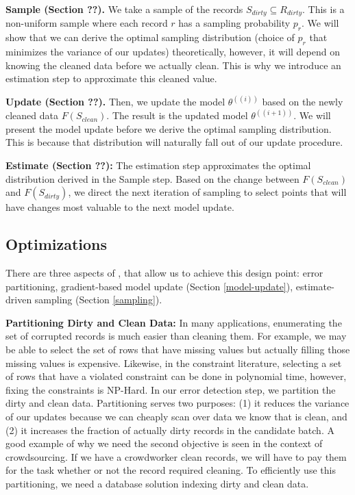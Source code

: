 \vspace{0.5em}

\noindent\textbf{Sample (Section ??). } We take a sample of the records $S_{dirty} \subseteq R_{dirty}$. This is a non-uniform sample where each record $r$ has a sampling probability $p_r$.
We will show that we can derive the optimal sampling distribution (choice of $p_r$ that minimizes the variance of our updates) theoretically, however, it will depend on knowing the cleaned data before we actually clean. This is why we introduce an estimation step to approximate this cleaned value.

\vspace{0.5em}

\noindent\textbf{Update (Section ??). } Then, we update the model $\theta^({(i)})$ based on the newly cleaned data $F(S_{clean})$. The result is the updated model $\theta^({(i+1)})$. We will present the model update before we derive the optimal sampling distribution.
This is because that distribution will naturally fall out of our update procedure.

\vspace{0.5em}

\noindent\textbf{Estimate (Section ??): } The estimation step approximates the optimal distribution derived in the Sample step. Based on the change between $F(S_{clean})$ and $F(S_{dirty})$, we direct the next iteration of sampling to select points that will have changes most valuable to the next model update.

\iffalse
\subsection{Optimizations}
There are three aspects of \sys, that allow us to achieve this design point: error partitioning, gradient-based model update (Section \ref{model-update}), estimate-driven sampling (Section \ref{sampling}).

\vspace{0.5em}

\noindent\textbf{Partitioning Dirty and Clean Data: } In many applications, enumerating the set of corrupted records is much easier than cleaning them. For example, we may be able to select the set of rows that have missing values but actually filling those missing values is expensive. Likewise, in the constraint literature, selecting a set of rows that have a violated constraint can be done in polynomial time, however, fixing the constraints is NP-Hard.
In our error detection step, we partition the dirty and clean data.
Partitioning serves two purposes: (1) it reduces the variance of our updates because we can cheaply scan over data we know that is clean, and (2) it increases the fraction of actually dirty records in the candidate batch.
A good example of why we need the second objective is seen in the context of crowdsourcing.
If we have a crowdworker clean records, we will have to pay them for the task whether or not the record required cleaning.
To efficiently use this partitioning, we need a database solution indexing dirty and clean data.

